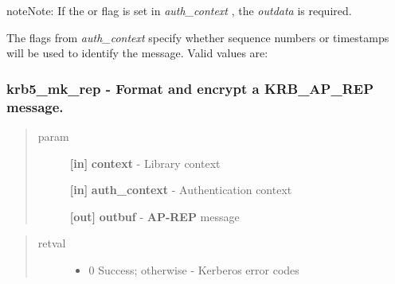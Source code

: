 \documentclass[letterpaper,10pt,english]{sphinxmanual}
\begin{document}
\begin{notice}{note}{Note:}
If the {\hyperref[appdev/refs/macros/KRB5_AUTH_CONTEXT_RET_TIME:KRB5_AUTH_CONTEXT_RET_TIME]{}} or {\hyperref[appdev/refs/macros/KRB5_AUTH_CONTEXT_RET_SEQUENCE:KRB5_AUTH_CONTEXT_RET_SEQUENCE]{}} flag is set in \emph{auth\_context} , the \emph{outdata} is required.

The flags from \emph{auth\_context} specify whether sequence numbers or timestamps will be used to identify the message. Valid values are:
\end{notice}


\subsubsection{krb5\_mk\_rep -  Format and encrypt a KRB\_AP\_REP message.}
\label{appdev/refs/api/krb5_mk_rep:krb5-mk-rep-format-and-encrypt-a-krb-ap-rep-message}\label{appdev/refs/api/krb5_mk_rep::doc}

\begin{fulllineitems}
\label{appdev/refs/api/krb5_mk_rep:c.krb5_mk_rep}
\end{fulllineitems}

\begin{quote}\begin{description}
\item[{param}] \leavevmode
\textbf{{[}in{]}} \textbf{context} - Library context

\textbf{{[}in{]}} \textbf{auth\_context} - Authentication context

\textbf{{[}out{]}} \textbf{outbuf} - \textbf{AP-REP} message

\end{description}\end{quote}
\begin{quote}\begin{description}
\item[{retval}] \leavevmode\begin{itemize}
\item {} 
0   Success; otherwise - Kerberos error codes

\end{itemize}

\end{description}\end{quote}
\end{document}
